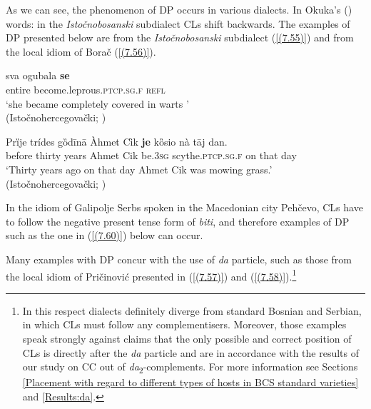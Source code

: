 
\noindent As we can see, the phenomenon of DP occurs in various dialects. In Okuka's (\citeyear[77]{Okuka08}) words: in the \textit{Istočnobosanski} subdialect CLs shift backwards. The examples of DP presented below are from the \textit{Istočnobosanski} subdialect (\ref{(7.55)}) and from the local idiom of Borač (\ref{(7.56)}). 

\begin{exe}\ex\label{(7.55)}
\gll sva ogubala \textbf{se} \\
entire become.leprous.\textsc{ptcp.sg.f} \textsc{refl}  \\
\glt ‘she became completely covered in warts ’ \\
\hfill  (Istočnohercegovački; \citealt[77]{Okuka08})

\ex\label{(7.56)}
\gll Prȉje trídes  gȍdīnā Àhmet Cȋk \textbf{je}  kȍsio  nà  tāj  dan.\\
before thirty years Ahmet Cik be.3\textsc{sg}  scythe.\textsc{ptcp.sg.f} on that day\\
\glt ‘Thirty years ago on that day Ahmet Cik was mowing grass.’ \\
\hfill  (Istočnohercegovački; \citealt[285]{Peco07a})
\end{exe}

\noindent In the idiom of Galipolje Serbs spoken in the Macedonian city Pehčevo, CLs have to follow the negative present tense form of \textit{biti}, and therefore examples of DP such as the one in (\ref{(7.60)}) below can occur.


\noindent Many examples with DP concur with the use of \textit{da} particle, such as those from the local idiom of Pričinović presented in (\ref{(7.57)}) and (\ref{(7.58)}).\footnote{In this respect dialects definitely diverge from standard Bosnian and Serbian, in which CLs must follow any complementisers. Moreover, those examples speak strongly against claims that the only possible and correct position of CLs is directly after the \textit{da} particle and are in accordance with the results of our study on CC out of \textit{da}\textsubscript{2}-complements. For more information see Sections \ref{Placement with regard to different types of hosts in BCS standard varieties} and \ref{Results:da}.} 

